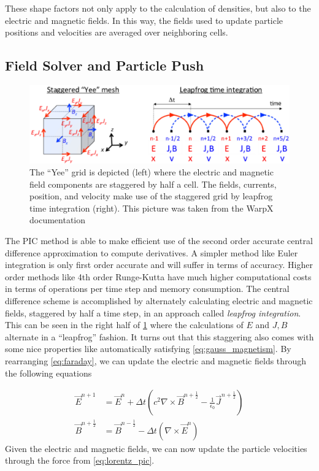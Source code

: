 These shape factors not only apply to the calculation of densities, but also to the electric and magnetic fields. In this way, the fields used to update particle positions and velocities are averaged over neighboring cells.

\subsection{Field Solver and Particle Push}

\begin{figure}
	\centering 
	\includegraphics[width=0.8\linewidth]{planning/images/yee_grid.PNG}
	\caption{The ``Yee'' grid is depicted (left) where the electric and magnetic field components are staggered by half a cell. The fields, currents, position, and velocity make use of the staggered grid by leapfrog time integration (right). This picture was taken from the WarpX documentation}
	\label{fig:yee_grid}
\end{figure}

The PIC method is able to make efficient use of the second order accurate central difference approximation to compute derivatives. A simpler method like Euler integration is only first order accurate and will suffer in terms of accuracy. Higher order methods like 4th order Runge-Kutta have much higher computational costs in terms of operations per time step and memory consumption. The central difference scheme is accomplished by alternately calculating electric and magnetic fields, staggered by half a time step, in an approach called \emph{leapfrog integration}\cite{Birdsall_2004_PIC}. This can be seen in the right half of \cref{fig:yee_grid} where the calculations of $E$ and $J,B$ alternate in a ``leapfrog'' fashion. It turns out that this staggering also comes with some nice properties like automatically satisfying \cref{eq:gauss_magnetism}. By rearranging \cref{eq:faraday}, we can update the electric and magnetic fields through the following equations\cite{Arber_2015_PPCF}

\begin{align}
	\vec{E}^{n+1} &= \vec{E}^{n} + \Delta t (c^2 \nabla \times \vec{B}^{n+\frac{1}{2}} - \frac{1}{\epsilon_0} \vec{J}^{n+\frac{1}{2}}) \label{eq:E_update} \\
	\vec{B}^{n+\frac{1}{2}} &= \vec{B}^{n-\frac{1}{2}} - \Delta t (\nabla \times \vec{E}^{n}) \label{eq:B_update}
\end{align}
Given the electric and magnetic fields, we can now update the particle velocities through the force from \cref{eq:lorentz_pic}. 

